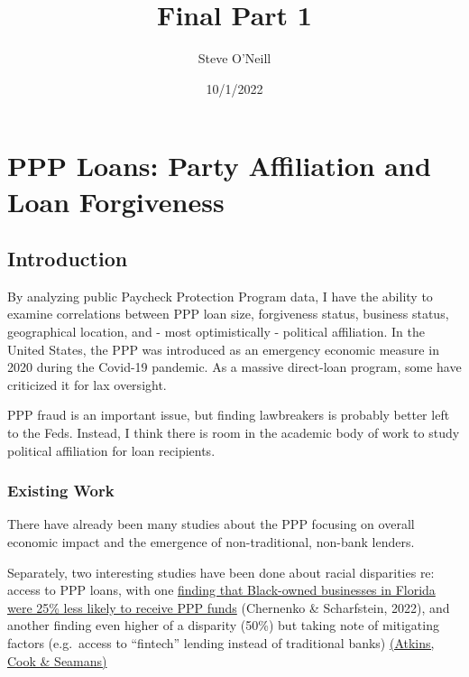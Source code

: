 \documentclass[
  letterpaper,
  DIV=11,
  numbers=noendperiod]{scrartcl}
\title{Final Part 1}
\author{Steve O'Neill}
\date{10/1/2022}
\renewcommand*\contentsname{Table of contents}
\newcommand\contentsname{Table of contents}
\begin{document}
\maketitle
\ifdefined\Shaded\renewenvironment{Shaded}{\begin{tcolorbox}[frame hidden, interior hidden, boxrule=0pt, breakable, sharp corners, enhanced, borderline west={3pt}{0pt}{shadecolor}]}{\end{tcolorbox}}\fi

\renewcommand*\contentsname{Table of contents}
{
\hypersetup{linkcolor=}
\setcounter{tocdepth}{3}
\tableofcontents
}
\hypertarget{ppp-loans-party-affiliation-and-loan-forgiveness}{%
\section{PPP Loans: Party Affiliation and Loan
Forgiveness}\label{ppp-loans-party-affiliation-and-loan-forgiveness}}

\hypertarget{introduction}{%
\subsection{Introduction}\label{introduction}}

By analyzing public Paycheck Protection Program data, I have the ability
to examine correlations between PPP loan size, forgiveness status,
business status, geographical location, and - most optimistically -
political affiliation. In the United States, the PPP was introduced as
an emergency economic measure in 2020 during the Covid-19 pandemic. As a
massive direct-loan program, some have criticized it for lax oversight.

PPP fraud is an important issue, but finding lawbreakers is probably
better left to the Feds. Instead, I think there is room in the academic
body of work to study political affiliation for loan recipients.

\hypertarget{existing-work}{%
\subsubsection{Existing Work}\label{existing-work}}

There have already been many studies about the PPP focusing on overall
economic impact and the emergence of non-traditional, non-bank lenders.

Separately, two interesting studies have been done about racial
disparities re: access to PPP loans, with one
\href{https://www.nber.org/system/files/working_papers/w29748/w29748.pdf}{finding
that Black-owned businesses in Florida were 25\% less likely to receive
PPP funds} (Chernenko \& Scharfstein, 2022), and another finding even
higher of a disparity (50\%) but taking note of mitigating factors
(e.g.~access to ``fintech'' lending instead of traditional banks)
\href{https://papers.ssrn.com/sol3/papers.cfm?abstract_id=3774992}{(Atkins,
Cook \& Seamans)}
\end{document}
